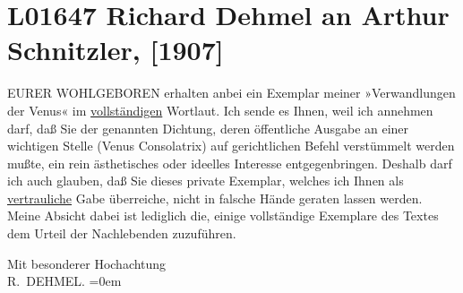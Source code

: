 

\section[Richard Dehmel an Arthur Schnitzler, {[}1907{]}]{L01647 Richard Dehmel an Arthur Schnitzler, {[}1907{]}}
\nopagebreak{}
\rehead{ }\normalsize\beginnumbering{}
\toendnotes[C]{\smallbreak\pagebreak[2]}
\pstart\center{}{\pb}EURER WOHLGEBOREN\pend\vspace{0.5em}
\pstart
           erhalten anbei ein Exemplar meiner »Verwandlungen der
                  Venus« im \uline{vollständigen} Wortlaut. Ich sende
               es Ihnen, weil ich annehmen darf, daß Sie der genannten Dichtung, deren öffentliche
               Ausgabe an einer wichtigen Stelle (Venus Consolatrix) auf gerichtlichen Befehl
               verstümmelt werden mußte, ein rein ästhetisches oder ideelles Interesse
               entgegenbringen. Deshalb darf ich auch glauben, daß Sie dieses private Exemplar,
               welches ich Ihnen als \uline{vertrauliche} Gabe überreiche,
               nicht in falsche Hände geraten lassen werden. Meine Absicht dabei ist lediglich die,
               einige vollständige Exemplare des Textes dem Urteil der Nachlebenden zuzuführen.\pend
           
\pstart
           Mit besonderer Hochachtung{\\[\baselineskip]}\spacefill\mbox{R. DEHMEL.}\pend
           \leftskip=0em{}\endnumbering{}  
      